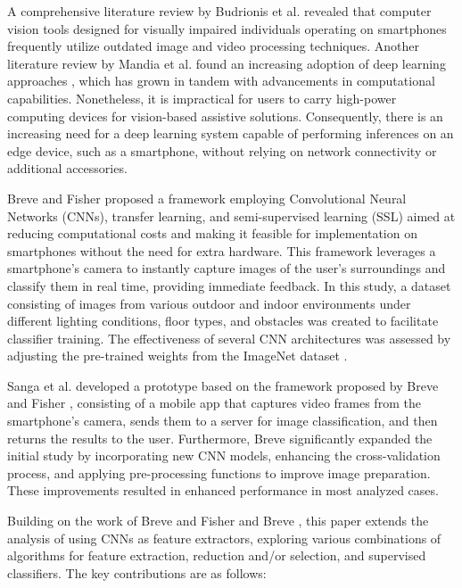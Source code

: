 \documentclass[preprint,12pt,authoryear]{elsarticle}
\begin{document}
A comprehensive literature review by Budrionis et al. \cite{budrionis2022} revealed that computer vision tools designed for visually impaired individuals operating on smartphones frequently utilize outdated image and video processing techniques. Another literature review by Mandia et al. \cite{mandia2023} found an increasing adoption of deep learning approaches \cite{lecun2015,goodfellow2016,schmidhuber2015}, which has grown in tandem with advancements in computational capabilities. Nonetheless, it is impractical for users to carry high-power computing devices for vision-based assistive solutions. Consequently, there is an increasing need for a deep learning system capable of performing inferences on an edge device, such as a smartphone, without relying on network connectivity or additional accessories.

Breve and Fisher \cite{breve2020} proposed a framework employing Convolutional Neural Networks (CNNs), transfer learning, and semi-supervised learning (SSL) aimed at reducing computational costs and making it feasible for implementation on smartphones without the need for extra hardware. This framework leverages a smartphone's camera to instantly capture images of the user's surroundings and classify them in real time, providing immediate feedback. In this study, a dataset consisting of images from various outdoor and indoor environments under different lighting conditions, floor types, and obstacles was created to facilitate classifier training. The effectiveness of several CNN architectures was assessed by adjusting the pre-trained weights from the ImageNet dataset \cite{russakovsky2015}.

Sanga et al. \cite{sanga2023} developed a prototype based on the framework proposed by Breve and Fisher \cite{breve2020}, consisting of a mobile app that captures video frames from the smartphone's camera, sends them to a server for image classification, and then returns the results to the user. Furthermore, Breve \cite{breve2023} significantly expanded the initial study by incorporating new CNN models, enhancing the cross-validation process, and applying pre-processing functions to improve image preparation. These improvements resulted in enhanced performance in most analyzed cases.

Building on the work of Breve and Fisher \cite{breve2020} and Breve \cite{breve2023}, this paper extends the analysis of using CNNs as feature extractors, exploring various combinations of algorithms for feature extraction, reduction and/or selection, and supervised classifiers. The key contributions are as follows:
\end{document}
